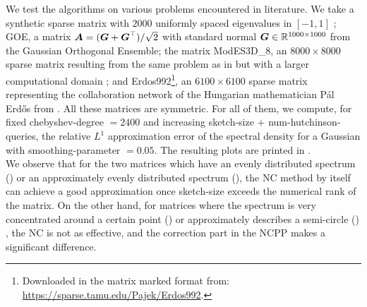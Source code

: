 We test the algorithms on various problems encountered in literature.
We take a synthetic sparse matrix with $2000$ uniformly spaced eigenvalues
in $[-1, 1]$ \cite{chen2021slq};
GOE, a matrix $\boldsymbol{A} = (\boldsymbol{G} + \boldsymbol{G}^{\top})/\sqrt{2}$ with standard
normal $\boldsymbol{G} \in \mathbb{R}^{1000 \times 1000}$ from the Gaussian Orthogonal Ensemble;
the matrix ModES3D\_8, an $8000 \times 8000$ sparse matrix resulting
from the same problem as in  but with
a larger computational domain \cite{lin2017randomized}; and
Erdos992\footnote{Downloaded in the matrix marked format from: \url{https://sparse.tamu.edu/Pajek/Erdos992}.},
an $6100 \times 6100$ sparse matrix representing the collaboration network of the
Hungarian mathematician P\'al Erd\H{o}s from \cite{chen2021slq}.
All these
matrices are symmetric. For all of them, we compute, for
fixed \gls{chebyshev-degree} $=2400$ and increasing \gls{sketch-size} $+$ \gls{num-hutchinson-queries},
the relative $L^1$ approximation error
of the spectral density for a Gaussian  with
\gls{smoothing-parameter} $=0.05$. The resulting plots are printed in 
.\\ 

We observe that for the two matrices which have an evenly distributed spectrum
() or an approximately
evenly distributed spectrum (),
the \gls{NC} method by itself can achieve a good approximation once \gls{sketch-size}
exceeds the numerical rank of the matrix. On the other hand, for matrices where
the spectrum is very concentrated around a certain point ()
or approximately describes a semi-circle () \cite{wigner1958distribution},
the \gls{NC} is not as effective, and the correction part in the \gls{NCPP} makes
a significant difference.

